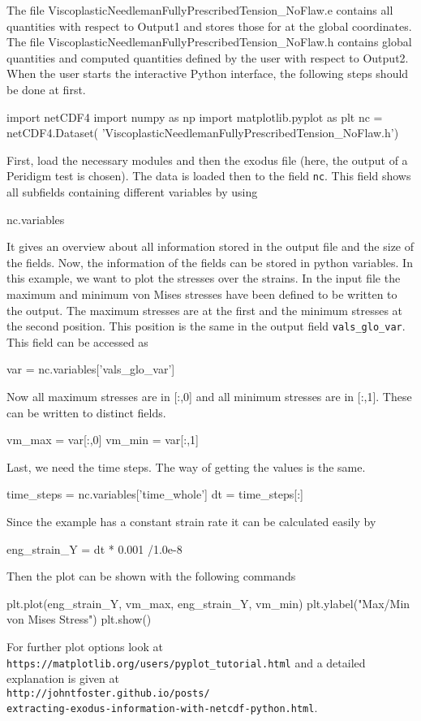  The file ViscoplasticNeedlemanFullyPrescribedTension\_NoFlaw.e contains all quantities with respect to Output1 and stores those for at the global coordinates. 
 The file ViscoplasticNeedlemanFullyPrescribedTension\_NoFlaw.h contains global
 quantities and computed quantities defined by the user with respect to Output2. When the user starts the interactive Python interface, the following steps should be done at first.
\begin{code}
import netCDF4
import numpy as np 
import matplotlib.pyplot as plt 
nc = netCDF4.Dataset(
'ViscoplasticNeedlemanFullyPrescribedTension_NoFlaw.h')
\end{code}
 First, load the necessary modules and then the exodus file (here, the output of a Peridigm test is chosen). The data is loaded then to the field \texttt{nc}. 
 This field shows all subfields containing different variables
 by using
\begin{code}
nc.variables 
\end{code}
 It gives an overview about all information stored in the output file and the size of the fields. Now, the information of the fields can be stored in python variables. In this example, we want to plot
 the stresses over the strains. In the input file the maximum and minimum von Mises stresses have been defined to be written to the output. The maximum stresses are at the first and the minimum stresses at the 
 second position. This position is the same in the output field \texttt{vals\_glo\_var}. This field can be accessed as 
\begin{code}
var = nc.variables['vals_glo_var']
\end{code}
 Now all maximum stresses are in [:,0] and all minimum stresses are in [:,1]. These can be written to distinct fields.
\begin{code}
vm_max = var[:,0] 
vm_min = var[:,1] 
\end{code}
 Last, we need the time steps. The way of getting the values is the same. 
\begin{code}
time_steps = nc.variables['time_whole'] 
dt = time_steps[:]
\end{code}
 Since the example has a constant strain rate it can be calculated easily by 
\begin{code}
eng_strain_Y = dt * 0.001 /1.0e-8
\end{code}
 Then the plot can be shown with the following commands
\begin{code}
plt.plot(eng_strain_Y, vm_max, eng_strain_Y, vm_min)
plt.ylabel("Max/Min von Mises Stress")
plt.show()
\end{code}
 For further plot options look at \\ \texttt{https://matplotlib.org/users/pyplot\_tutorial.html} and a detailed explanation is given at \\
 \texttt{http://johntfoster.github.io/posts/\\extracting-exodus-information-with-netcdf-python.html}.

